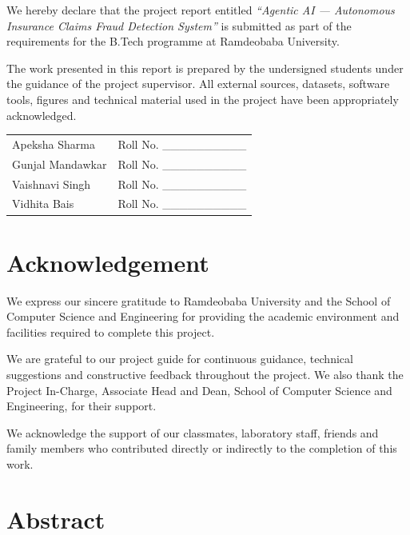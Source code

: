 \documentclass[12pt,a4paper]{article}
\begin{document}
We hereby declare that the project report entitled \textit{``Agentic AI --- Autonomous Insurance Claims Fraud Detection System''} is submitted as part of the requirements for the B.Tech programme at Ramdeobaba University.

The work presented in this report is prepared by the undersigned students under the guidance of the project supervisor.  All external sources, datasets, software tools, figures and technical material used in the project have been appropriately acknowledged.

\vspace{1cm}
\begin{tabular}{ll}
Apeksha Sharma   & Roll No. \_\_\_\_\_\_\_\_\_\_ \\[6pt]
Gunjal Mandawkar & Roll No. \_\_\_\_\_\_\_\_\_\_ \\[6pt]
Vaishnavi Singh  & Roll No. \_\_\_\_\_\_\_\_\_\_ \\[6pt]
Vidhita Bais     & Roll No. \_\_\_\_\_\_\_\_\_\_ \\
\end{tabular}

\newpage
\section*{Acknowledgement}

We express our sincere gratitude to Ramdeobaba University and the School of Computer Science and Engineering for providing the academic environment and facilities required to complete this project.

We are grateful to our project guide for continuous guidance, technical suggestions and constructive feedback throughout the project.  We also thank the Project In-Charge, Associate Head and Dean, School of Computer Science and Engineering, for their support.

We acknowledge the support of our classmates, laboratory staff, friends and family members who contributed directly or indirectly to the completion of this work.

\newpage
\section*{Abstract}
\end{document}
